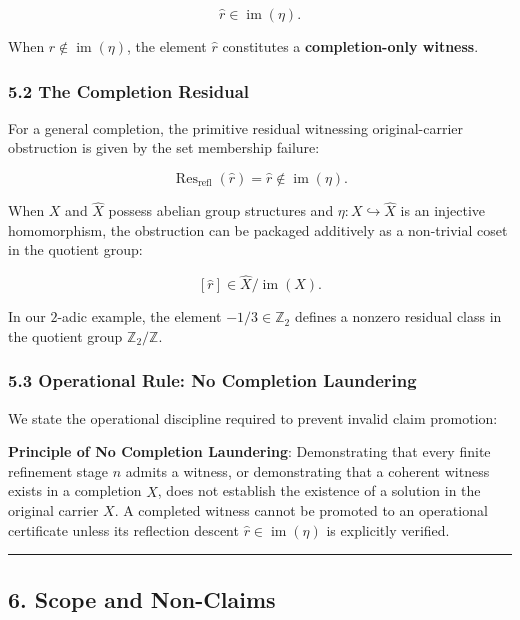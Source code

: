 \documentclass[
  11pt,
]{article}
\theoremstyle{plain}
\theoremstyle{definition}\newtheorem{definition}[theorem]{Definition}
\theoremstyle{remark}\newtheorem*{remark}{Remark}
\renewenvironment{quote}{%
  \begin{mdframed}[linewidth=0pt,leftline=true,linecolor=obrule,
    rightline=false,topline=false,bottomline=false,
    innerleftmargin=1em,innerrightmargin=0.8em,innertopmargin=0.5em,
    innerbottommargin=0.5em,skipabove=0.6em,skipbelow=0.6em,
    backgroundcolor=obboxbg]\small}{\end{mdframed}}
\begin{document}
\[
\hat{r} \in \operatorname{im}(\eta).
\]

When \(\hat{r} \notin \operatorname{im}(\eta)\), the element \(\hat{r}\)
constitutes a \textbf{completion-only witness}.

\subsubsection{5.2 The Completion
Residual}\label{the-completion-residual}

For a general completion, the primitive residual witnessing
original-carrier obstruction is given by the set membership failure:

\[
\operatorname{Res}_{\text{refl}}(\hat{r}) = \hat{r} \notin \operatorname{im}(\eta).
\]

When \(X\) and \(\widehat{X}\) possess abelian group structures and
\(\eta: X \hookrightarrow \widehat{X}\) is an injective homomorphism,
the obstruction can be packaged additively as a non-trivial coset in the
quotient group:

\[
[\hat{r}] \in \widehat{X} / \operatorname{im}(X).
\]

In our \(2\)-adic example, the element \(-1/3 \in \mathbb{Z}_2\) defines
a nonzero residual class in the quotient group
\(\mathbb{Z}_2 / \mathbb{Z}\).

\subsubsection{5.3 Operational Rule: No Completion
Laundering}\label{operational-rule-no-completion-laundering}

We state the operational discipline required to prevent invalid claim
promotion:

\begin{quote}
\textbf{Principle of No Completion Laundering}: Demonstrating that every
finite refinement stage \(n\) admits a witness, or demonstrating that a
coherent witness exists in a completion \(\widehat{X}\), does not
establish the existence of a solution in the original carrier \(X\). A
completed witness cannot be promoted to an operational certificate
unless its reflection descent \(\hat{r} \in \operatorname{im}(\eta)\) is
explicitly verified.
\end{quote}

\begin{center}\rule{0.5\linewidth}{0.5pt}\end{center}

\subsection{6. Scope and Non-Claims}\label{scope-and-non-claims}
\end{document}
